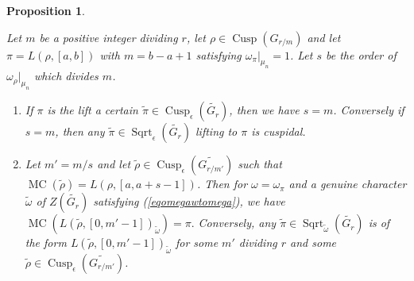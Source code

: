\documentclass{amsart}
\numberwithin{equation}{section}
\newtheorem{proposition}[theorem]{\bf{Proposition}}
\newcommand{\rest}{\lvert}
\newcommand{\mrcusp}{\operatorname{Cusp}}
\newcommand{\mrsqrt}{\operatorname{Sqrt}}
\newcommand{\mrmc}{\operatorname{MC}}
\newcommand{\wt}[1]{\widetilde{#1}}
\begin{document}
	\begin{proposition}\label{propmcsqrtclassification}
		
		Let $m$ be a positive integer dividing $r$, let $\rho\in\mrcusp(G_{r/m})$ and let $\pi=L(\rho,[a,b])$ with $m=b-a+1$ satisfying $\omega_{\pi}\rest_{\mu_{n}}=1$. Let $s$ be the order of $\omega_{\rho}\rest_{\mu_{n}}$ which divides $m$.
		
		\begin{enumerate}
			\item If $\pi$ is the lift a certain $\wt{\pi}\in\mrcusp_{\epsilon}(\wt{G_{r}})$, then we have $s=m$. Conversely if $s=m$, then any $\wt{\pi}\in\mrsqrt_{\epsilon}(\wt{G_{r}})$ lifting to $\pi$ is cuspidal.
			
			\item 	Let $m'=m/s$ and let $\wt{\rho}\in\mrcusp_{\epsilon}(\wt{G_{r/m'}})$ such that $\mrmc(\wt{\rho})=L(\rho,[a,a+s-1])$.
			Then for $\omega=\omega_{\pi}$ and  a genuine character $\wt{\omega}$ of $Z(\wt{G_{r}})$ satisfying (\ref{eqomegawtomega}), we have 
			$\mrmc(L(\wt{\rho},[0,m'-1])_{\wt{\omega}})=\pi.$
			Conversely, any $\wt{\pi}\in\mrsqrt_{\wt{\omega}}(\wt{G_{r}})$ is of the form $L(\wt{\rho},[0,m'-1])_{\wt{\omega}}$ for some $m'$ dividing $r$ and some $\wt{\rho}\in\mrcusp_{\epsilon}(\wt{G_{r/m'}})$.
		\end{enumerate} 
		
	\end{proposition}
	
\end{document}
